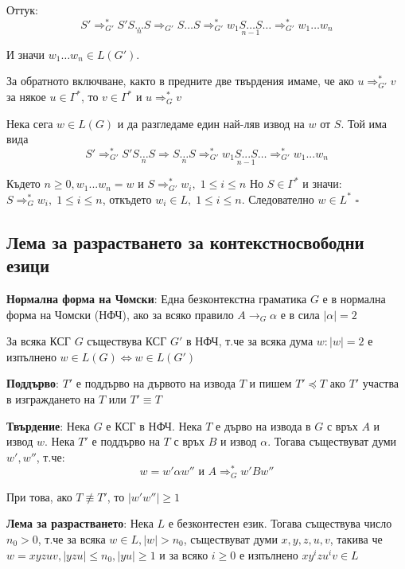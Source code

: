 \documentclass{article}
\renewcommand{\\}{\newline}
\newcommand{\proven}{\hfill $\square$}
\begin{document}
      Оттук: \[
        S' \Rightarrow^{*}_{G'} S'\underset{n}{S\dots S} \Rightarrow_{G'} S\dots S \Rightarrow_{G'}^{*} w_{1}\underset{n-1}{S\dots S} \dots \Rightarrow^{*}_{G'} w_{1}\dots w_{n}
      \] 

      И значи \(w_{1}\dots w_{n} \in L(G')\). 

      За обратното включване, както в предните две твърдения имаме, че ако \(u \Rightarrow_{G'}^{*} v\) за някое \( u \in \Gamma^{*}\), то \(v \in \Gamma^{*}\) и \(u \Rightarrow^{*}_{G} v\)      

      Нека сега \( w \in L(G)\) и да разгледаме един най-ляв извод на \(w\) от \(S\). Той има вида\[
        S' \Rightarrow_{G'}^{*} S'\underset{n}{S\dots S} \Rightarrow \underset{n}{S\dots S} \Rightarrow_{G'}^{*} w_{1}\underset{n-1}{S...S} \dots \Rightarrow_{G'}^{*} w_{1}...w_{n}
      \]   

      Където \(n\geq0, w_1...w_n = w\) и \(S \Rightarrow_{G'}^{*} w_{i},\; 1 \leq i \leq n\)   
      Но \(S \in \Gamma^{*}\) и значи: \(S \Rightarrow_{G}^{*} w_{i},\; 1 \leq i \leq n\), откъдето \( w_{i} \in L,\; 1 \leq i \leq n\). Следователно \(w \in L^{*}\)  \proven

      \subsection{Лема за разрастването за контекстносвободни езици }
      \textbf{Нормална форма на Чомски}: Една безконтекстна граматика \(G\) е в нормална форма на Чомски (НФЧ), ако за всяко правило \(A \to_{G} \alpha\) е в сила \(\left|\alpha\right|= 2\)   

      За всяка КСГ \(G\) съществува КСГ \(G'\) в НФЧ, т.че за всяка дума \(w: |w| = 2\) е изпълнено \(w \in L(G) \iff w \in L(G')\)  

      \textbf{Поддърво}: \(T'\) е поддърво на дървото на извода \(T\) и пишем \(T' \preceq T\) ако \(T'\) участва в изграждането на \(T\) или \(T' \equiv T\)       

      \textbf{Твърдение}: Нека \(G\) е КСГ в НФЧ. Нека \(T\) е дърво на извода в \(G\) с връх \(A\) и извод \(w\). Нека \(T'\) е поддърво на \(T\) с връх \(B\) и извод \(\alpha\). Тогава съществуват думи \(w', w''\), т.че: \[
        w = w'\alpha w'' \text{ и }A \Rightarrow_{G}^{*} w'Bw''
      \]        

      При това, ако \(T \not\equiv T'\), то \(\left|w'w''\right| \geq 1\)   

      \textbf{Лема за разрастването}: Нека \(L\) е безконтестен език. Тогава съществува число \(n_{0} > 0\), т.че за всяка \(w \in L, \left|w\right|> n_0\), съществуват думи \(x, y, z, u, v\), такива че \(w = xyzuv, \left|yzu\right| \leq n_0, \left|yu\right| \geq 1\) и за всяко \(i \geq 0\) е изпълнено \(xy^{i}zu^{i}v \in L\)      
      
\end{document}
